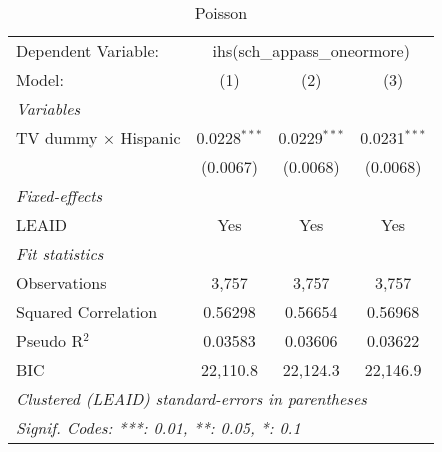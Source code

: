 \begin{table}[htbp]
\centering
\caption{Poisson}
\begin{tabular}{lccc}
\tabularnewline\midrule\midrule
Dependent Variable:&\multicolumn{3}{c}{ihs(sch\_appass\_oneormore)}\\
Model:&(1) & (2) & (3)\\
\midrule \emph{Variables}&   &   &  \\
TV dummy $\times$ Hispanic & 0.0228$^{***}$ & 0.0229$^{***}$ & 0.0231$^{***}$\\
  &(0.0067) & (0.0068) & (0.0068)\\
\midrule \emph{Fixed-effects}&   &   &  \\
LEAID & Yes & Yes & Yes\\
\midrule \emph{Fit statistics}&  & & \\
Observations & 3,757&3,757&3,757\\
Squared Correlation & 0.56298&0.56654&0.56968\\
Pseudo R$^2$ & 0.03583&0.03606&0.03622\\
BIC & 22,110.8&22,124.3&22,146.9\\
\midrule\midrule\multicolumn{4}{l}{\emph{Clustered (LEAID) standard-errors in parentheses}}\\
\multicolumn{4}{l}{\emph{Signif. Codes: ***: 0.01, **: 0.05, *: 0.1}}\\
\end{tabular}
\end{table}

